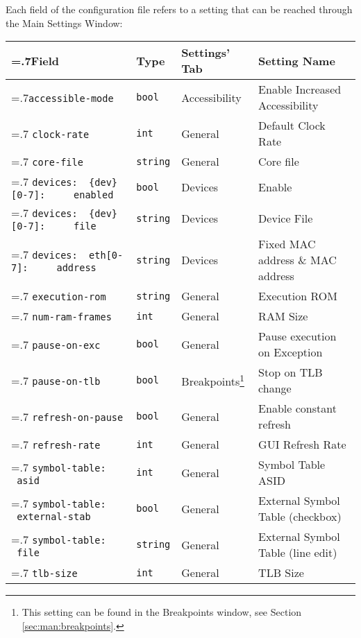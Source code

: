 Each field of the configuration file refers to a setting that can be reached through the Main Settings Window:\\
\begin{tabularx}{\textwidth}{|>{\hsize=.7\hsize}X|l|l|>{\hsize=1.3\hsize}X|}
	\hline
	Field & Type & Settings' Tab & Setting Name \\
	\hline
	\hline
	\texttt{accessible-mode} & \texttt{bool} & Accessibility & Enable Increased Accessibility\\
	\hline
	\texttt{clock-rate} & \texttt{int} & General & Default Clock Rate \\
	\hline
	\texttt{core-file} & \texttt{string} & General & Core file \\
	\hline
	\texttt{devices: \newline \- \ \{dev\}[0-7]: \newline \- \ \ \ \ enabled} & \texttt{bool} & Devices & Enable \\
	\hline
	\texttt{devices: \newline \- \ \{dev\}[0-7]: \newline \- \ \ \ \ file} & \texttt{string} & Devices & Device File \\
	\hline
	\texttt{devices: \newline \- \ eth[0-7]: \newline \- \ \ \ \ address} & \texttt{string} & Devices & Fixed MAC address \& MAC address \\
	\hline
	\texttt{execution-rom} & \texttt{string} & General & Execution ROM \\
	\hline
	\texttt{num-ram-frames} & \texttt{int} & General & RAM Size \\
	\hline
	\texttt{pause-on-exc} & \texttt{bool} & General & Pause execution on Exception \\
	\hline
	\texttt{pause-on-tlb} & \texttt{bool} & Breakpoints\footnote{This setting can be found in the Breakpoints window, see Section \ref{sec:man:breakpoints}.} & Stop on TLB change \\
	\hline
	\texttt{refresh-on-pause} & \texttt{bool} & General & Enable constant refresh \\
	\hline
	\texttt{refresh-rate} & \texttt{int} & General & GUI Refresh Rate \\
	\hline
	\texttt{symbol-table: \newline \- \ asid} & \texttt{int} & General & Symbol Table ASID \\
	\hline
	\texttt{symbol-table: \newline \- \ external-stab} & \texttt{bool} & General & External Symbol Table (checkbox) \\
	\hline
	\texttt{symbol-table: \newline \- \ file} & \texttt{string} & General & External Symbol Table (line edit) \\
	\hline
	\texttt{tlb-size} & \texttt{int} & General & TLB Size \\
	\hline
\end{tabularx}

